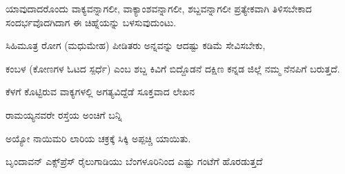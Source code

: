 \vspace{4pt plus 4pt minus 1pt}\hspace{0.5em}ಯಾವುದಾದರೊಂದು ವಾಕ್ಯವನ್ನಾಗಲೀ, ವಾಕ್ಯಾಂಶವನ್ನಾಗಲೀ, ಶಬ್ದವನ್ನಾಗಲೀ ಪ್ರತ್ಯೇಕವಾಗಿ ತಿಳಿಸಬೇಕಾದ ಸಂದರ್ಭವೊದಗಿದಾಗ ಈ ಚಿಹ್ನೆಯನ್ನು ಬಳಸುವುದುಂಟು.\par

\vspace{3pt plus 2pt}\noindent\hspace*{1.2em}\par\vspace{1pt}

\vspace{2.5pt plus 3pt minus 0.5pt}\noindent\hspace*{1.2em}\hspace{0.55em}ಸಿಹಿಮೂತ್ರ ರೋಗ (ಮಧುಮೇಹ) ಪೀಡಿತರು ಅನ್ನವನ್ನು ಆದಷ್ಟು ಕಡಿಮೆ ಸೇವಿಸಬೇಕು,\par

\vspace{2.5pt plus 3pt minus 0.5pt}\noindent\hspace*{1.2em}\hspace{0.55em}ಕಂಬಳ (ಕೋಣಗಳ ಓಟದ ಸ್ಪರ್ಧೆ) ಎಂಬ ಶಬ್ದ ಕಿವಿಗೆ ಬಿದ್ದೊಡನೆ ದಕ್ಷಿಣ ಕನ್ನಡ ಜಿಲ್ಲೆ ನಮ್ಮ ನೆನಪಿಗೆ ಬರುತ್ತದೆ.\par


\indent ಕೆಳಗೆ ಕೊಟ್ಟಿರುವ ವಾಕ್ಯಗಳಲ್ಲಿ ಅಗತ್ಯವಿದ್ದೆಡೆ ಸೂಕ್ತವಾದ ಲೇಖನ\par


\vspace{2.5pt plus 3pt minus 0.5pt}\noindent\hspace*{1.2em}\hspace{0.55em}ರಾಮಯ್ಯನವರೇ ರಸ್ತೆಯ ಅಂಚಿಗೆ ಬನ್ನಿ\par

\vspace{2.5pt plus 3pt minus 0.5pt}\noindent\hspace*{1.2em}\hspace{0.55em}ಅಯ್ಯೋ ನಾಯಿಮರಿ ಲಾರಿಯ ಚಕ್ರಕ್ಕೆ ಸಿಕ್ಕಿ ಅಪ್ಪಚ್ಚಿ ಯಾಯಿತು.\par

\vspace{2.5pt plus 3pt minus 0.5pt}\noindent\hspace*{1.2em}\hspace{0.55em}ಬೃಂದಾವನ್‌ ಎಕ್ಸ್‌ಪ್ರೆಸ್‌ ರೈಲುಗಾಡಿಯು ಬೆಂಗಳೂರಿನಿಂದ ಎಷ್ಟು ಗಂಟೆಗೆ ಹೊರಡುತ್ತದೆ\par


